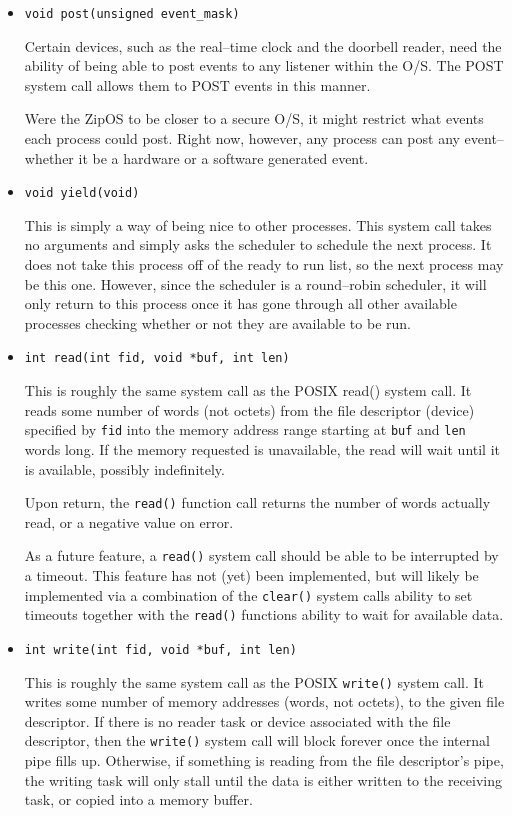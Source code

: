 \documentclass{gqtekspec}
\begin{document}
\begin{itemize}
\item {\tt void post(unsigned event\_mask)}

	Certain devices, such as the real--time clock and the doorbell
	reader, need the ability of being able to post events to any listener
	within the O/S.  The POST system call allows them to POST events in
	this manner.

	Were the ZipOS to be closer to a secure O/S, it might restrict what
	events each process could post.  Right now, however, any process can
	post any event--whether it be a hardware or a software generated event.

\item {\tt void yield(void) }

	This is simply a way of being nice to other processes.  This system
	call takes no arguments and simply asks the scheduler to schedule the
	next process.  It does not take this process off of the ready to run
	list, so the next process may be this one.  However, since the scheduler
	is a round--robin scheduler, it will only return to this process once
	it has gone through all other available processes checking whether or
	not they are available to be run.

\item {\tt int read(int fid, void *buf, int len)}

	This is roughly the same system call as the POSIX read() system
	call.  It reads some number of words (not octets) from the file
	descriptor (device) specified by {\tt fid} into the memory address
	range starting at {\tt buf} and {\tt len} words long.  If the memory
	requested is unavailable,
	the read will wait until it is available, possibly indefinitely.

	Upon return, the {\tt read()} function call returns the number of
	words actually read, or a negative value on error.

	As a future feature, a {\tt read()} system call should be able to be
	interrupted by a timeout.  This feature has not (yet) been implemented,
	but will likely be implemented via a combination of the {\tt clear()}
	system calls ability to set timeouts together with the {\tt read()}
	functions ability to wait for available data.

\item {\tt int write(int fid, void *buf, int len)}

	This is roughly the same system call as the POSIX {\tt write()} system
	call.  It writes some number of memory addresses (words, not octets),
	to the given file descriptor.  If there is no reader task or device
	associated with the file descriptor, then the {\tt write()} system
	call will block forever once the internal pipe fills up.  Otherwise,
	if something is reading from the file descriptor's pipe, the writing
	task will only stall until the data is either written to the receiving
	task, or copied into a memory buffer.


\end{itemize}
\end{document}
